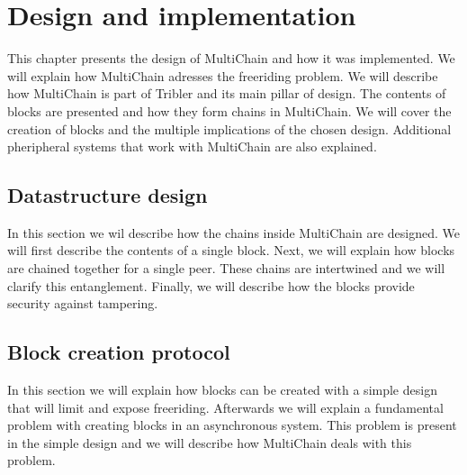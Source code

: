 \chapter{Design and implementation}
This chapter presents the design of MultiChain and how it was implemented.
We will explain how MultiChain adresses the freeriding problem.
We will describe how MultiChain is part of Tribler and its main pillar of design.
The contents of blocks are presented and how they form chains in MultiChain.
We will cover the creation of blocks and the multiple implications of the chosen design.
Additional pheripheral systems that work with MultiChain are also explained.



\section{Datastructure design}
In this section we wil describe how the chains inside MultiChain are designed.
We will first describe the contents of a single block.
Next, we will explain how blocks are chained together for a single peer.
These chains are intertwined and we will clarify this entanglement.
Finally, we will describe how the blocks provide security against tampering.






\section{Block creation protocol}
\label{design:block_creation}
In this section we will explain how blocks can be created with a simple design
that will limit and expose freeriding.
Afterwards we will explain a fundamental problem with creating blocks in an asynchronous system.
This problem is present in the simple design
and we will describe how MultiChain deals with this problem.














